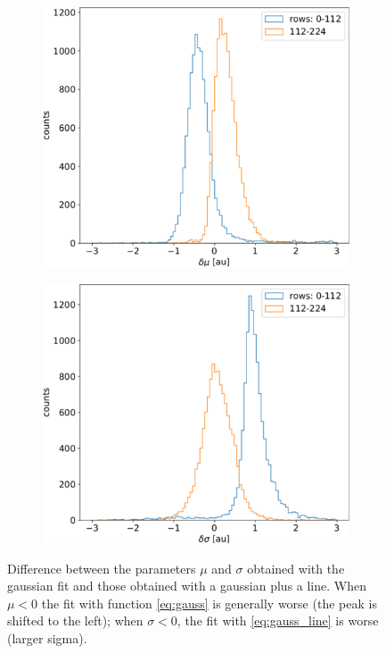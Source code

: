         \begin{figure}
            \centering
            \begin{subfigure}[b]{0.49\textwidth}
                \centering
                \includegraphics[width=\linewidth]{figures/charaterization/deltam_Fe.pdf}
                \caption{}
                \label{fig:delta_m}
            \end{subfigure}
            \hfill
            \begin{subfigure}[b]{0.49\textwidth}
                \centering
                \includegraphics[width=\linewidth]{figures/charaterization/deltas_Fe.pdf}      
                \caption{}
                \label{fig:delta_s}
            \end{subfigure}
            \caption{Difference between the parameters $\mu$ and $\sigma$ obtained with the gaussian fit and those obtained with a gaussian plus a line. When $\mu<$0 the fit with function \ref{eq:gauss} is generally worse (the peak is shifted to the left); when $\sigma<0$, the fit with \ref{eq:gauss_line} is worse (larger sigma). }
            \label{fig:delta_fit}
       \end{figure}        

